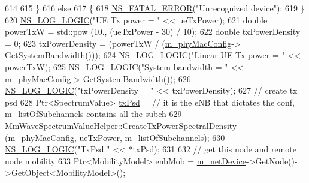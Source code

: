 \begin{DoxyCode}
614 
615                 \}
616                 \textcolor{keywordflow}{else}
617                 \{
618                         \hyperlink{group__fatal_ga5131d5e3f75d7d4cbfd706ac456fdc85}{NS\_FATAL\_ERROR}(\textcolor{stringliteral}{"Unrecognized device"});
619                 \}
620                 \hyperlink{group__logging_ga88acd260151caf2db9c0fc84997f45ce}{NS\_LOG\_LOGIC}(\textcolor{stringliteral}{"UE Tx power = "} << ueTxPower);
621             \textcolor{keywordtype}{double} powerTxW = std::pow (10., (ueTxPower - 30) / 10);
622             \textcolor{keywordtype}{double} txPowerDensity = 0;
623         txPowerDensity = (powerTxW / (\hyperlink{classns3_1_1MmWavePhy_a869abf36bbdbb94eed77ba6e4846f6e4}{m\_phyMacConfig}->
      \hyperlink{classns3_1_1MmWavePhyMacCommon_a8a0b7aa68fc805eb3e8cbdc289fde04c}{GetSystemBandwidth}()));
624             \hyperlink{group__logging_ga88acd260151caf2db9c0fc84997f45ce}{NS\_LOG\_LOGIC}(\textcolor{stringliteral}{"Linear UE Tx power = "} << powerTxW);
625             \hyperlink{group__logging_ga88acd260151caf2db9c0fc84997f45ce}{NS\_LOG\_LOGIC}(\textcolor{stringliteral}{"System bandwidth = "} << \hyperlink{classns3_1_1MmWavePhy_a869abf36bbdbb94eed77ba6e4846f6e4}{m\_phyMacConfig}->
      \hyperlink{classns3_1_1MmWavePhyMacCommon_a8a0b7aa68fc805eb3e8cbdc289fde04c}{GetSystemBandwidth}());
626             \hyperlink{group__logging_ga88acd260151caf2db9c0fc84997f45ce}{NS\_LOG\_LOGIC}(\textcolor{stringliteral}{"txPowerDensity = "} << txPowerDensity);
627                 \textcolor{comment}{// create tx psd}
628                 Ptr<SpectrumValue> \hyperlink{lte__link__budget_8m_a684fe3101a5e48a5fcc57cab8dbcd1aa}{txPsd} =                                         \textcolor{comment}{// it is the eNB
       that dictates the conf, m\_listOfSubchannels contains all the subch}
629                         \hyperlink{classns3_1_1MmWaveSpectrumValueHelper_a1a968ae81d81f346027fe474e7962148}{MmWaveSpectrumValueHelper::CreateTxPowerSpectralDensity}
       (\hyperlink{classns3_1_1MmWavePhy_a869abf36bbdbb94eed77ba6e4846f6e4}{m\_phyMacConfig}, ueTxPower, \hyperlink{classns3_1_1MmWaveEnbPhy_aa13c933468e02fe5f7f10a6a68cea43e}{m\_listOfSubchannels});
630                 \hyperlink{group__logging_ga88acd260151caf2db9c0fc84997f45ce}{NS\_LOG\_LOGIC}(\textcolor{stringliteral}{"TxPsd "} << *txPsd);
631 
632                 \textcolor{comment}{// get this node and remote node mobility}
633                 Ptr<MobilityModel> enbMob = \hyperlink{classns3_1_1MmWavePhy_a0f14f4e8f7539b06497ba321d9df344c}{m\_netDevice}->GetNode()->GetObject<MobilityModel>(); 

\end{DoxyCode}
